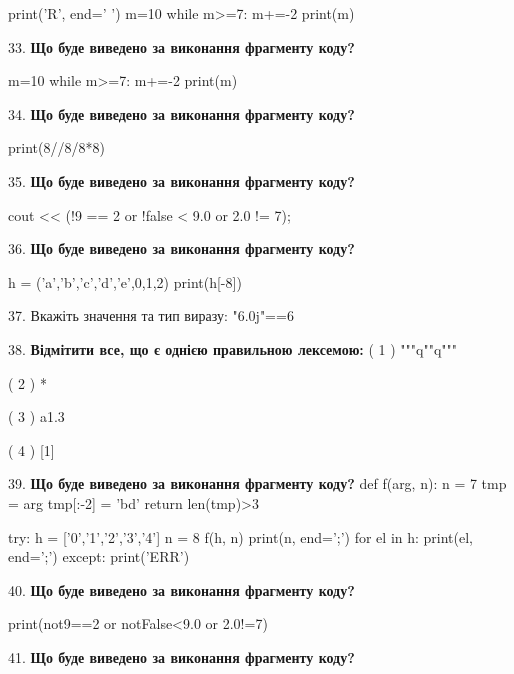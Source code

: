 \documentclass[11pt]{article}
\begin{document}
print('R', end=' ')
m=10
while m>=7:
    m+=-2
print(m)

\par\vspace{5mm}
33. \textbf{Що буде виведено за виконання фрагменту коду?}

m=10
while m>=7:
    m+=-2
print(m)

\par\vspace{5mm}
34. \textbf{Що буде виведено за виконання фрагменту коду?}

print(8//8/8*8)
\par\vspace{5mm}
35. \textbf{Що буде виведено за виконання фрагменту коду?}

cout << (!9 == 2 or !false < 9.0 or 2.0 != 7);
\par\vspace{5mm}
36. \textbf{Що буде виведено за виконання фрагменту коду?}

h = ('a','b','c','d','e',0,1,2)
print(h[-8])

\par\vspace{5mm}
37. 
Вкажіть значення та тип виразу:
"6.0j"==6
\par\vspace{5mm}
38. %
\textbf{Відмітити все, що є однією правильною лексемою:}
( 1 ) """q""q"""

( 2 ) *

( 3 ) a1.3

( 4 ) [1]
\par\vspace{5mm}
39. \textbf{Що буде виведено за виконання фрагменту коду?}
def f(arg, n):
    n = 7
    tmp = arg
    tmp[:-2] = 'bd'
    return len(tmp)>3

try:
    h = ['0','1','2','3','4']
    n = 8
    f(h, n)
    print(n, end=';')
    for el in h:
        print(el, end=';')
except:
    print('ERR')
\par\vspace{5mm}
40. \textbf{Що буде виведено за виконання фрагменту коду?}

print(not9==2 or notFalse<9.0 or 2.0!=7)
\par\vspace{5mm}
41. \textbf{Що буде виведено за виконання фрагменту коду?}
\end{document}
